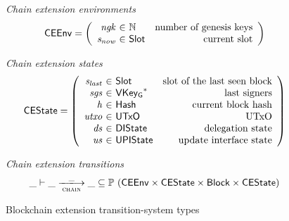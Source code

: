 \documentclass[11pt,a4paper]{article}
\newcommand{\powerset}[1]{\mathbb{P}~#1}
\newcommand{\var}[1]{\mathit{#1}}
\newcommand{\type}[1]{\mathsf{#1}}
\newcommand{\trans}[2]{\xlongrightarrow[\textsc{#1}]{#2}}
\newcommand{\seqof}[1]{#1^{*}}
\newcommand{\Hash}{\type{Hash}}  %
\newcommand{\Slot}{\type{Slot}}
\newcommand{\Block}{\type{Block}}
\newcommand{\VKeyGen}{\type{VKey_G}}
\begin{document}
\begin{figure}[ht]
  \emph{Chain extension environments}
  \begin{equation*}
    \CEEnv
    = \left(
      \begin{array}{r@{~\in~}lr}
        \var{ngk} & \mathbb{N} & \text{number of genesis keys}\\
        \var{s_{now}} & \Slot & \text{current slot}
      \end{array}\right)
  \end{equation*}


  \emph{Chain extension states}
  \begin{equation*}
    \CEState =
    \left(
      \begin{array}{r@{~\in~}lr}
        \var{s_{last}} & \Slot & \text{slot of the last seen block} \\
        \var{sgs} & \seqof{\VKeyGen} & \text{last signers}\\
        \var{h} & \Hash & \text{current block hash} \\
        \var{utxo} & \UTxO & \text{UTxO} \\
        \var{ds} & \DIState & \text{delegation state}\\
        \var{us} & \UPIState & \text{update interface state} \\
      \end{array}
    \right)
  \end{equation*}

  \emph{Chain extension transitions}
  \begin{equation*}
    \_ \vdash \var{\_} \trans{chain}{\_} \var{\_} \subseteq
    \powerset (\CEEnv \times \CEState \times \Block \times \CEState)
  \end{equation*}

  \caption{Blockchain extension transition-system types}
  \label{fig:ts-types:chain-extension}
\end{figure}
\end{document}
